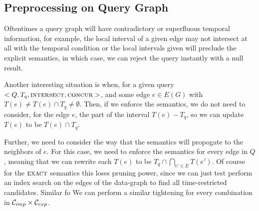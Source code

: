 \subsection{Preprocessing on Query Graph}

Oftentimes a query graph will have contradictory or superfluous temporal
information, for example, the local interval of a given edge may not intersect
at all with the temporal condition or the local intervals given will preclude
the explicit semantics, in which case, we can reject the query instantly with a
null result.

Another interesting situation is when, for a given query $<Q, T_q,
\textsc{intersect}, \textsc{concur}>$, and some edge $e \in E(G)$ with $T(e) \neq T(e) \cap T_q \neq
\emptyset$. Then, if we enforce the \intersection{} semantics, we do not need to
consider, for the edge $e$, the part of the interval $T(e) - T_q$, so we can
update $T(e)$ to be $T(e) \cap T_q$.

Further, we need to consider the way that the \concurrent{} semantics will
propogate to the neighbors of $e$. For this case, we need to enforce the
\intersection{} semantics for every edge in $Q$, meaning that we can rewrite
each $T(e)$ to be $T_q \cap \bigcap_{e' \in E} T(e')$. Of course for the
$\textsc{exact}$ semantics this loses pruning power, since we can just test perform an
index search on the edges of the data-graph to find all time-restricted
candidates. Similar fo We can perform a similar tightening for every combination
in $\mathcal{C}_{imp} \times \mathcal{C}_{exp}$.

